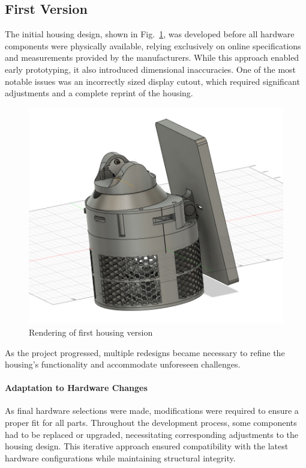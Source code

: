 \subsection{First Version}  

The initial housing design, shown in Fig.~\ref{fig:firsthousingversion}, was developed before all hardware components were physically available, relying exclusively on online specifications and measurements provided by the manufacturers. While this approach enabled early prototyping, it also introduced dimensional inaccuracies. One of the most notable issues was an incorrectly sized display cutout, which required significant adjustments and a complete reprint of the housing.  

\begin{figure}[H]
	\centering
	\includegraphics[width=1.0\linewidth]{figures/first_housing_version}
	\caption{Rendering of first housing version}
	\label{fig:firsthousingversion}
\end{figure}

As the project progressed, multiple redesigns became necessary to refine the housing’s functionality and accommodate unforeseen challenges.

\paragraph{Adaptation to Hardware Changes}  
As final hardware selections were made, modifications were required to ensure a proper fit for all parts. Throughout the development process, some components had to be replaced or upgraded, necessitating corresponding adjustments to the housing design. This iterative approach ensured compatibility with the latest hardware configurations while maintaining structural integrity.  

